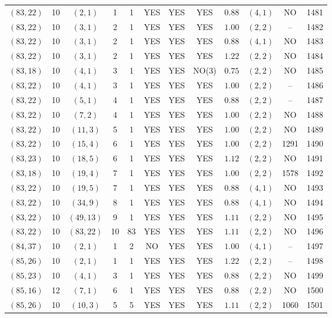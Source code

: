 \begin{longtable}{|c|c|c|c|c|c|c|c|c|c|c|c|}
$(83,22)$ & 10 & $(2,1)$ & 1 & 1 & YES & YES & YES & $0.88$ & $(4,1)$ & NO & 1481\\
$(83,22)$ & 10 & $(3,1)$ & 2 & 1 & YES & YES & YES & $1.00$ & $(2,2)$ & -- & 1482\\
$(83,22)$ & 10 & $(3,1)$ & 2 & 1 & YES & YES & YES & $0.88$ & $(4,1)$ & NO & 1483\\
$(83,22)$ & 10 & $(3,1)$ & 2 & 1 & YES & YES & YES & $1.22$ & $(2,2)$ & NO & 1484\\
$(83,18)$ & 10 & $(4,1)$ & 3 & 1 & YES & YES & NO(3) & $0.75$ & $(2,2)$ & NO & 1485\\
$(83,22)$ & 10 & $(4,1)$ & 3 & 1 & YES & YES & YES & $1.00$ & $(2,2)$ & -- & 1486\\
$(83,22)$ & 10 & $(5,1)$ & 4 & 1 & YES & YES & YES & $0.88$ & $(2,2)$ & -- & 1487\\
$(83,22)$ & 10 & $(7,2)$ & 4 & 1 & YES & YES & YES & $1.00$ & $(2,2)$ & NO & 1488\\
$(83,22)$ & 10 & $(11,3)$ & 5 & 1 & YES & YES & YES & $1.00$ & $(2,2)$ & NO & 1489\\
$(83,22)$ & 10 & $(15,4)$ & 6 & 1 & YES & YES & YES & $1.00$ & $(2,2)$ & 1291 & 1490\\
$(83,23)$ & 10 & $(18,5)$ & 6 & 1 & YES & YES & YES & $1.12$ & $(2,2)$ & NO & 1491\\
$(83,18)$ & 10 & $(19,4)$ & 7 & 1 & YES & YES & YES & $1.00$ & $(2,2)$ & 1578 & 1492\\
$(83,22)$ & 10 & $(19,5)$ & 7 & 1 & YES & YES & YES & $0.88$ & $(4,1)$ & NO & 1493\\
$(83,22)$ & 10 & $(34,9)$ & 8 & 1 & YES & YES & YES & $0.88$ & $(4,1)$ & NO & 1494\\
$(83,22)$ & 10 & $(49,13)$ & 9 & 1 & YES & YES & YES & $1.11$ & $(2,2)$ & NO & 1495\\
$(83,22)$ & 10 & $(83,22)$ & 10 & 83 & YES & YES & YES & $1.11$ & $(2,2)$ & NO & 1496\\
$(84,37)$ & 10 & $(2,1)$ & 1 & 2 & NO & YES & YES & $1.00$ & $(4,1)$ & -- & 1497\\
$(85,26)$ & 10 & $(2,1)$ & 1 & 1 & YES & YES & YES & $1.22$ & $(2,2)$ & -- & 1498\\
$(85,23)$ & 10 & $(4,1)$ & 3 & 1 & YES & YES & YES & $0.88$ & $(2,2)$ & NO & 1499\\
$(85,16)$ & 12 & $(7,1)$ & 6 & 1 & YES & YES & YES & $0.88$ & $(2,2)$ & NO & 1500\\
$(85,26)$ & 10 & $(10,3)$ & 5 & 5 & YES & YES & YES & $1.11$ & $(2,2)$ & 1060 & 1501\\

\end{longtable}
